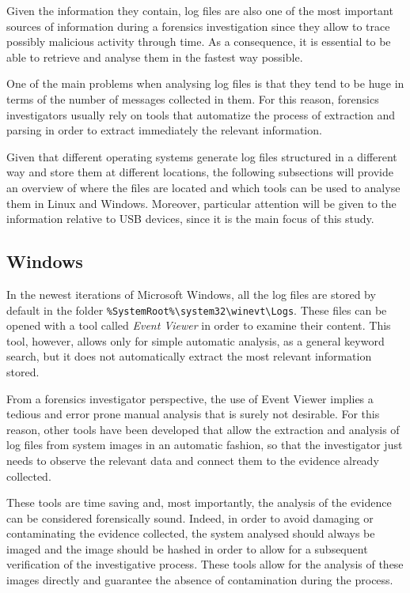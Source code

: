 \documentclass[a4paper]{article}
\begin{document}
Given the information they contain, log files are also one of the most important
sources of information during a forensics investigation since they allow to
trace possibly malicious activity through time. As a consequence, it is
essential to be able to retrieve and analyse them in the fastest way
possible.~\cite{finlayson1987log}

One of the main problems when analysing log files is that they tend to be huge
in terms of the number of messages collected in them. For this reason, forensics
investigators usually rely on tools that automatize the process of extraction
and parsing in order to extract immediately the relevant information.

Given that different operating systems generate log files structured in a
different way and store them at different locations, the following subsections
will provide an overview of where the files are located and which tools can
be used to analyse them in Linux and Windows. Moreover, particular attention
will be given to the information relative to USB devices, since it is the main
focus of this study.

\subsection{Windows}\label{sec:litWindows}
In the newest iterations of Microsoft Windows, all the log files are stored by
default in the folder
\texttt{\%SystemRoot\%\textbackslash{}system32\textbackslash{}winevt\textbackslash{}Logs}.
These files can be opened with a tool called \emph{Event Viewer} in order to
examine their content. This tool, however, allows only for simple automatic
analysis, as a general keyword search, but it does not automatically extract
the most relevant information stored.

From a forensics investigator perspective, the use of Event Viewer implies a
tedious and error prone manual analysis that is surely not desirable. For this
reason, other tools have been developed that allow the extraction and analysis
of log files from system images in an automatic fashion, so that the
investigator just needs to observe the relevant data and connect them to the
evidence already collected.

These tools are time saving and, most importantly, the analysis of the evidence
can be considered forensically sound. Indeed, in order to avoid damaging or
contaminating the evidence collected, the system analysed should always be
imaged and the image should be hashed in order to allow for a subsequent
verification of the investigative process. These tools allow for the analysis of
these images directly and guarantee the absence of contamination during the
process.~\cite{murphey2007automated}
\end{document}
